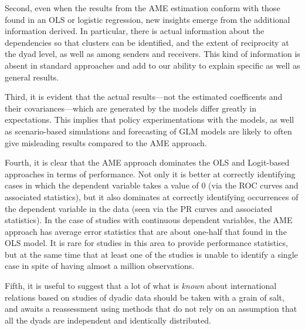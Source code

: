 Second, even when the results from the AME estimation conform with those found in an OLS or logistic regression, new insights
emerge from the additional information derived. In particular, there is actual information about the dependencies so that clusters can be identified, and the extent of reciprocity at the dyad level, as well as among senders and receivers.  This kind of information
is absent in standard approaches and add to our ability to explain specific as well as general results.

Third, it is evident that the actual results---not the estimated coefficents and their covariances---which are generated by the models differ greatly in expectations.  This implies that policy experimentations with the models, as well as scenario-based simulations and forecasting of GLM models are likely to often give misleading results compared to the AME approach.

Fourth, it is clear that the AME approach dominates the OLS and Logit-based approaches in terms of performance. Not only it is better at correctly identifying cases in which the dependent variable takes a value of $0$ (via the ROC curves and associated statistics), but it also dominates at correctly identifying occurrences of the dependent variable in the data (seen via the PR curves and associated statistics).  In the case of studies
with continuous dependent variables, the AME approach has average error statistics that are about one-half that found in the OLS model. It is rare for studies in this area to provide performance statistics, but at the same time that at least one of the studies is unable to identify a single case in spite of having almost a million observations.

Fifth, it is useful to suggest that a lot of what is \textit{known} about international relations based on studies of dyadic data should be taken with a grain of salt, and awaits a reassessment using methods that do not rely on an assumption that all the dyads are independent and identically distributed.



